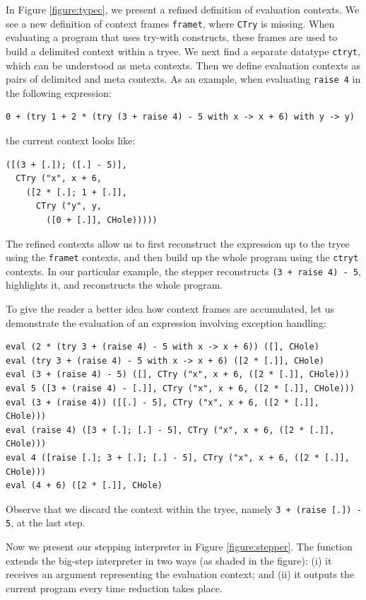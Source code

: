 In Figure \ref{figure:typec}, we present a refined definition of evaluation contexts.  We see a new definition of context frames \texttt{frame\US t}, where \texttt{CTry} is missing.  When evaluating a program that uses try-with constructs, these frames are used to build a delimited context within a tryee.  We next find a separate datatype \texttt{ctry\US t}, which can be understood as meta contexts.  Then we define evaluation contexts as pairs of delimited and meta contexts.  As an example, when evaluating \texttt{raise 4} in the following expression:
\begin{verbatim}
0 + (try 1 + 2 * (try (3 + raise 4) - 5 with x -> x + 6) with y -> y)
\end{verbatim}
\noindent the current context looks like:
\begin{verbatim}
([(3 + [.]); ([.] - 5)],
  CTry ("x", x + 6,
    ([2 * [.]; 1 + [.]],
      CTry ("y", y,
        ([0 + [.]], CHole)))))
\end{verbatim}

The refined contexts allow us to first reconstruct the expression up to the tryee using the \texttt{frame\US t} contexts, and then build up the whole program using the \texttt{ctry\US t} contexts.  In our particular example, the stepper reconstructs \texttt{(3 + raise 4) - 5}, highlights it, and reconstructs the whole program.

To give the reader a better idea how context frames are accumulated, let us demonstrate the evaluation of an expression involving exception handling:

\begin{verbatim}
eval (2 * (try 3 + (raise 4) - 5 with x -> x + 6)) ([], CHole)
eval (try 3 + (raise 4) - 5 with x -> x + 6) ([2 * [.]], CHole)
eval (3 + (raise 4) - 5) ([], CTry ("x", x + 6, ([2 * [.]], CHole)))
eval 5 ([3 + (raise 4) - [.]], CTry ("x", x + 6, ([2 * [.]], CHole)))
eval (3 + (raise 4)) ([[.] - 5], CTry ("x", x + 6, ([2 * [.]], CHole)))
eval (raise 4) ([3 + [.]; [.] - 5], CTry ("x", x + 6, ([2 * [.]], CHole)))
eval 4 ([raise [.]; 3 + [.]; [.] - 5], CTry ("x", x + 6, ([2 * [.]], CHole)))
eval (4 + 6) ([2 * [.]], CHole)
\end{verbatim}

\noindent Observe that we discard the context within the tryee, namely \texttt{3 + (raise [.])\ - 5}, at the last step.

Now we present our stepping interpreter in Figure \ref{figure:stepper}.  The function extends the big-step interpreter in two ways (as shaded in the figure): (i) it receives an argument representing the evaluation context; and (ii) it outputs the current program every time reduction takes place.  

